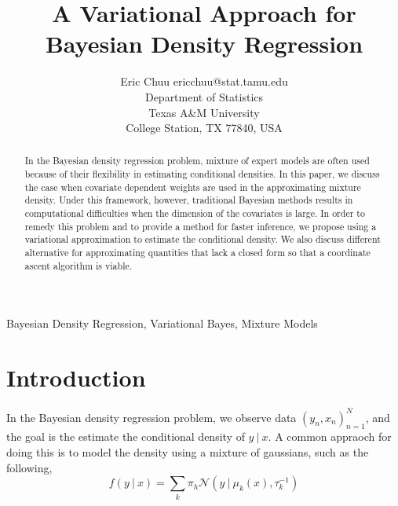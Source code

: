 \documentclass[twoside,11pt]{article}
\newcommand\given[1][]{\:#1\vert\:}
\begin{document}
\title{A Variational Approach for Bayesian Density Regression}

\author{\name Eric Chuu \email ericchuu@stat.tamu.edu \\
       \addr Department of Statistics\\
       Texas A\&M University \\
       College Station, TX 77840, USA}

\maketitle

\begin{abstract}%
In the Bayesian density regression problem, mixture of expert models are often used because of their flexibility in estimating conditional densities. In this paper, we discuss the case when covariate dependent weights are used in the approximating mixture density. Under this framework, however, traditional Bayesian methods results in computational difficulties when the dimension of the covariates is large. In order to remedy this problem and to provide a method for faster inference, we propose using a variational approximation to estimate the conditional density. We also discuss different alternative for approximating quantities that lack a closed form so that a coordinate ascent algorithm is viable.
\end{abstract}

\begin{keywords}
  Bayesian Density Regression, Variational Bayes, Mixture Models
\end{keywords}

\section{Introduction}

In the Bayesian density regression problem, we observe data $\left(y_n, x_n \right)_{n=1}^N$, and the goal is the estimate the conditional density of $y \given x$. A common appraoch for doing this is to model the density using a mixture of gaussians, such as the following,
\begin{equation} \label{eq:general_gm}
	f(y \given x) = \sum_{k} \pi_h \mathcal{N} \left(y \given \mu_k(x), \tau_k^{-1} \right)
\end{equation}
\end{document}
